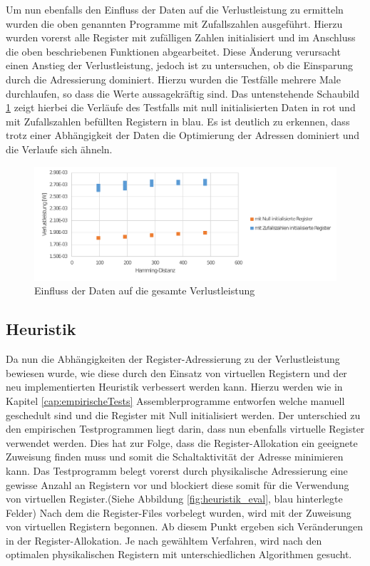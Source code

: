 Um nun ebenfalls den Einfluss der Daten auf die Verlustleistung zu ermitteln wurden die oben genannten Programme mit Zufallszahlen ausgeführt. Hierzu wurden vorerst alle Register mit zufälligen Zahlen initialisiert und im Anschluss die oben beschriebenen Funktionen abgearbeitet. Diese Änderung verursacht einen Anstieg der Verlustleistung, jedoch ist zu untersuchen, ob die Einsparung durch die Adressierung dominiert. Hierzu wurden die Testfälle mehrere Male durchlaufen, so dass die Werte aussagekräftig sind. Das untenstehende Schaubild \ref{fig:random_data_total_power} zeigt hierbei die Verläufe des Testfalls mit null initialisierten Daten in rot und mit Zufallszahlen befüllten Registern in blau. Es ist deutlich zu erkennen, dass trotz einer Abhängigkeit der Daten die Optimierung der Adressen dominiert und die Verlaufe sich ähneln.

\begin{figure}[H]
	\centering
	\includegraphics[width=\textwidth]{fig/random_data_total_power.pdf}
	\caption{Einfluss der Daten auf die gesamte Verlustleistung}
	\label{fig:random_data_total_power}
\end{figure}


\subsection{Heuristik}
\label{chap:eval_heuristik}
Da nun die Abhängigkeiten der Register-Adressierung zu der Verlustleistung bewiesen wurde, wie diese durch den Einsatz von virtuellen Registern und der neu implementierten Heuristik verbessert werden kann. Hierzu werden wie in Kapitel \ref{cap:empirischeTests} Assemblerprogramme entworfen welche manuell geschedult sind und die Register mit Null initialisiert werden. Der unterschied zu den empirischen Testprogrammen liegt darin, dass nun ebenfalls virtuelle Register verwendet werden.
Dies hat zur Folge, dass die Register-Allokation ein geeignete Zuweisung finden muss und somit die Schaltaktivität der Adresse minimieren kann. Das Testprogramm belegt vorerst durch physikalische Adressierung eine gewisse Anzahl an Registern vor und blockiert diese somit für die Verwendung von virtuellen Register.(Siehe Abbildung \ref{fig:heuristik_eval}, blau hinterlegte Felder)
Nach dem die Register-Files vorbelegt wurden, wird mit der Zuweisung von virtuellen Registern begonnen. Ab diesem Punkt ergeben sich Veränderungen in der Register-Allokation. Je nach gewähltem Verfahren, wird nach den optimalen physikalischen Registern mit unterschiedlichen Algorithmen gesucht. 

